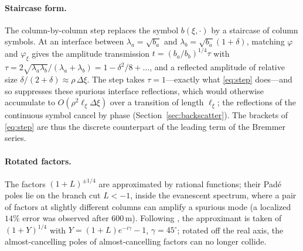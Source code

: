 \documentclass[11pt]{article}
\begin{document}
\paragraph{Staircase form.} The column-by-column step replaces the symbol
$b(\xi,\cdot)$ by a staircase of column symbols. At an interface between
$\lambda_a=\sqrt{b_a}$ and $\lambda_b=\sqrt{b_a}(1+\delta)$, matching
$\varphi$ and $\varphi_\xi$ gives the amplitude transmission
$t=(b_a/b_b)^{1/4}\tau$ with
$\tau=2\sqrt{\lambda_a\lambda_b}/(\lambda_a+\lambda_b)=1-\delta^2/8+\dots$,
and a reflected amplitude of relative size
$\delta/(2+\delta)\approx\rho\,\Delta\xi$. The step takes
$\tau=1$---exactly what \eqref{eq:step} does---and so suppresses these
spurious interface reflections, which would otherwise accumulate to
$O(\rho^2\ell_\xi\Delta\xi)$ over a transition of length $\ell_\xi$; the
reflections of the continuous symbol cancel by phase
(Section~\ref{sec:backscatter}). The brackets of \eqref{eq:step} are
thus the discrete counterpart of the leading term of the Bremmer series.

\paragraph{Rotated factors.} The factors $(1+L)^{\pm1/4}$ are approximated by
rational functions; their Pad\'e poles lie on the branch cut $L<-1$, inside
the evanescent spectrum, where a pair of factors at slightly different
columns can amplify a spurious mode (a localized $14\%$ error was observed
after $600$\,m). Following \cite{milinazzo1997}, the approximant is
taken of $(1+Y)^{1/4}$ with $Y=(1+L)e^{-i\gamma}-1$, $\gamma=45^\circ$;
rotated off the real axis, the almost-cancelling poles of almost-cancelling
factors can no longer collide.
\end{document}
